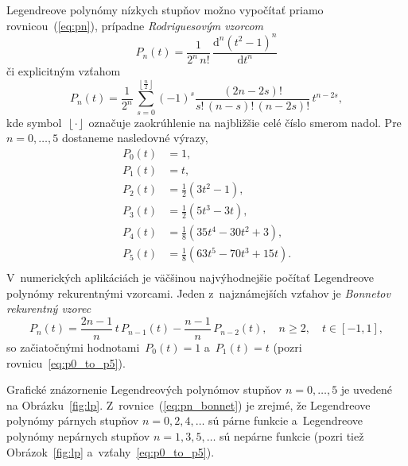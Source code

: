 \documentclass[a4paper, 12pt]{book}
\newcommand{\diff}{\mathrm d}
\begin{document}
Legendreove polynómy nízkych stupňov možno vypočítať priamo
rovnicou~(\ref{eq:pn}), prípadne \emph{Rodriguesovým vzorcom}
\parencite{SansoGeoidDetermination}
%
\begin{equation}
\label{eq:pn_rodrigues}
P_n(t) = \frac{1}{2^n \, n!} \, \frac{\diff^n (t^2 - 1)^n}{\diff t^n}
\end{equation}
%
či explicitným vzťahom \parencite{Freeden2009}
%
\begin{equation}
P_n(t) = \frac{1}{2^n} \, \sum_{s = 0}^{\left\lfloor \frac{n}{2} \right\rfloor}
(-1)^s \frac{(2n - 2s)!}{s!  \, (n - s)! \, (n - 2s)!} \, t^{n - 2s}{,}
\end{equation}
%
kde symbol~$\left\lfloor \cdot \right\rfloor$ označuje zaokrúhlenie na
najbližšie celé číslo smerom nadol.  Pre $n = 0, \dots, 5$ dostaneme nasledovné
výrazy,
%
\begin{equation}
\label{eq:p0_to_p5}
\begin{split}
P_0(t) & = 1{,}\\
P_1(t) & = t{,}\\
P_2(t) & = \frac{1}{2} \left( 3t^2  - 1 \right){,}\\
P_3(t) & = \frac{1}{2} (5t^3 - 3t){,}\\
P_4(t) & = \frac{1}{8}(35t^4 - 30t^2 + 3){,}\\
P_5(t) & = \frac{1}{8}(63t^5 - 70t^3 + 15t){.}\\
\end{split}
\end{equation}
%
V~numerických aplikáciách je väčšinou najvýhodnejšie počítať Legendreove 
polynómy rekurentnými vzorcami.  Jeden z~najznámejších vzťahov je 
\emph{Bonnetov rekurentný vzorec}
%
\begin{equation}
\label{eq:pn_bonnet}
P_n(t) = \frac{2n - 1}{n} \, t \, P_{n - 1}(t) - \frac{n - 1}{n} \, P_{n
- 2}(t){,} \quad n \geq 2{,} \quad t \in [-1, 1]{,}
\end{equation}
%
so začiatočnými hodnotami~$P_0(t) = 1$ a~$P_1(t) = t$ (pozri
rovnicu~\ref{eq:p0_to_p5}).

Grafické znázornenie Legendreových polynómov stupňov $n =0, \dots, 5$ je 
uvedené na Obrázku~\ref{fig:lp}.  Z~rovnice~(\ref{eq:pn_bonnet}) je zrejmé, že 
Legendreove polynómy párnych stupňov $n = 0, 2, 4, \dots$ sú párne funkcie 
a~Legendreove polynómy nepárnych stupňov $n = 1, 3, 5, \dots$ sú nepárne 
funkcie (pozri tiež Obrázok~\ref{fig:lp} a~vzťahy~\ref{eq:p0_to_p5}).
\end{document}
